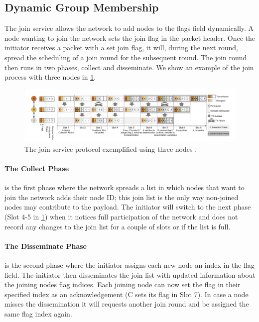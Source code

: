 \subsection{Dynamic Group Membership}
\label{background-a2-join-service}
The join service allows the network to add nodes to the flags field dynamically. A node wanting to join the network sets the join flag in the packet header. Once the initiator receives a packet with a set join flag, it will, during the next round, spread the scheduling of a join round for the subsequent round. The join round then runs in two phases, collect and disseminate. We show an example of the join process with three nodes in \cref{fig:join-service-overview}.

\begin{figure}[bt]
    \centering
    \includegraphics[width=\textwidth]{figure/JoinServiceOverview.png}
    \caption{The join service protocol exemplified using three nodes \cite{a2-introduction-paper}.}
    \label{fig:join-service-overview}
\end{figure}

\paragraph*{The Collect Phase} is the first phase where the network spreads a list in which nodes that want to join the network adds their node ID; this join list is the only way non-joined nodes may contribute to the payload. The initiator will switch to the next phase (Slot 4-5 in \cref{fig:join-service-overview}) when it notices full participation of the network and does not record any changes to the join list for a couple of slots or if the list is full.

\paragraph*{The Disseminate Phase} is the second phase where the initiator assigns each new node an index in the flag field. The initiator then disseminates the join list with updated information about the joining nodes flag indices. Each joining node can now set the flag in their specified index as an acknowledgement (C sets its flag in Slot 7). In case a node misses the dissemination it will requests another join round and be assigned the same flag index again.

